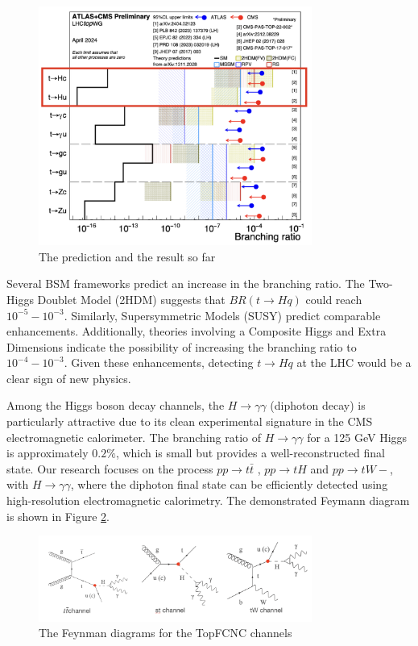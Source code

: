 \begin{figure}[htbp]
    \centering
    \includegraphics[width=0.8\textwidth]{Figures/topfcnc.png}
    \caption{The prediction and the result so far}
    \label{fig:TopFCNC}
\end{figure}

Several BSM frameworks predict an increase in the branching ratio. The Two-Higgs Doublet Model (2HDM) suggests that $BR(t \to Hq)$ could reach $10^{-5} - 10^{-3}$.\cite{noauthor_fcnchistory_nodate} Similarly, Supersymmetric Models (SUSY) predict comparable enhancements. Additionally, theories involving a Composite Higgs and Extra Dimensions indicate the possibility of increasing the branching ratio to $10^{-4} - 10^{-3}$. Given these enhancements, detecting $t \to Hq$ at the LHC would be a clear sign of new physics.

Among the Higgs boson decay channels, the $H \to \gamma\gamma$ (diphoton decay) is particularly attractive due to its clean experimental signature in the CMS electromagnetic calorimeter. The branching ratio of $H \to \gamma\gamma$ for a 125 GeV Higgs is approximately $0.2\%$, which is small but provides a well-reconstructed final state. Our research focuses on the process $pp \to t\bar{t}$ , $pp \to tH$ and $pp \to tW-$, with $H \to \gamma\gamma$, where the diphoton final state can be efficiently detected using high-resolution electromagnetic calorimetry. The demonstrated Feymann diagram is shown in Figure \ref{fig:TopFCNC_channels}.

\begin{figure}[htbp]
    \centering
    \includegraphics[width=0.8\textwidth]{Figures/topfcnc_channels.png}
    \caption{The Feynman diagrams for the TopFCNC channels}
    \label{fig:TopFCNC_channels}
\end{figure}

